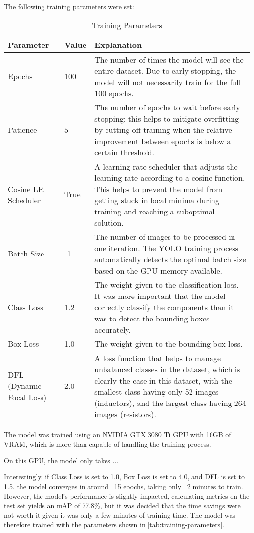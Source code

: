 The following training parameters were set:

\begin{table}[H]
  \centering
  \begin{tabularx}{0.9\textwidth}{|p{4cm}|p{1.5cm}|X|}
    \hline
    \textbf{Parameter} & \textbf{Value} & \textbf{Explanation} \\
    \hline
    Epochs & 100 & The number of times the model will see the entire dataset. Due to early stopping, the model will not necessarily train for the full 100 epochs. \\
    \hline
    Patience & 5 & The number of epochs to wait before early stopping; this helps to mitigate overfitting by cutting off training when the relative improvement between epochs is below a certain threshold. \\
    \hline
    Cosine LR Scheduler & True & A learning rate scheduler that adjusts the learning rate according to a cosine function. This helps to prevent the model from getting stuck in local minima during training and reaching a suboptimal solution. \\
    \hline
    Batch Size & -1 & The number of images to be processed in one iteration. The YOLO training process automatically detects the optimal batch size based on the GPU memory available. \\
    \hline
    Class Loss & 1.2 & The weight given to the classification loss. It was more important that the model correctly classify the components than it was to detect the bounding boxes accurately. \\
    \hline
    Box Loss & 1.0 & The weight given to the bounding box loss. \\
    \hline
    DFL (Dynamic Focal Loss) & 2.0 & A loss function that helps to manage unbalanced classes in the dataset, which is clearly the case in this dataset, with the smallest class having only 52 images (inductors), and the largest class having 264 images (resistors). \\
    \hline
  \end{tabularx}
  \caption{Training Parameters}
  \label{tab:training-parameters}
\end{table}

The model was trained using an NVIDIA GTX 3080 Ti GPU with 16GB of VRAM, which is more than capable of handling the training process. 


On this GPU, the model only takes ...

Interestingly, if Class Loss is set to 1.0, Box Loss is set to 4.0, and DFL is set to 1.5, the model converges in around ~15 epochs, taking only ~2 minutes to train. However, the model's performance is slightly impacted, calculating metrics on the test set yields an mAP of 77.8\%, but it was decided that the time savings were not worth it given it was only a few minutes of training time. The model was therefore trained with the parameters shown in \autoref{tab:training-parameters}.
